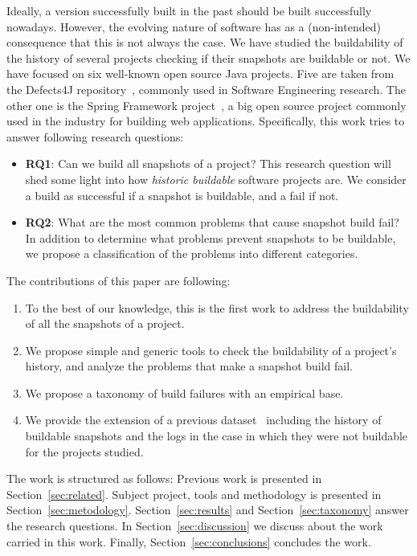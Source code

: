 Ideally, a version successfully built in the past should be built successfully nowadays.
However, the evolving nature of software has as a (non-intended) consequence that this is not always the case.
We have studied the buildability of the history of several projects checking if their snapshots are buildable or not.
We have focused on six well-known open source Java projects.
Five are taken from the Defects4J repository~\cite{Just:2014:DDE:2610384.2628055}, commonly used in Software Engineering research.
The other one is the Spring Framework project~\cite{Spring:2019:Online}, a big open source project commonly used in the industry for building web applications.
Specifically, this work tries to answer following research questions:

\begin{itemize}
	\item \textbf{RQ1}: Can we build all snapshots of a project? 
    This research question will shed some light into how \emph{historic buildable} software projects are. We consider a build as successful if a snapshot is buildable, and a fail if not.
	\item \textbf{RQ2}:  What are the most common problems that cause snapshot build fail?
    In addition to determine what problems prevent snapshots to be buildable, we propose a classification of the problems into different categories.
\end{itemize}

The contributions of this paper are following:
    
\begin{enumerate}
	\item To the best of our knowledge, this is the first work to address the buildability of all the snapshots of a project.
	\item We propose simple and generic tools to check the buildability of a project's history, and analyze the problems that make a snapshot build fail.
	\item We propose a taxonomy of build failures with an empirical base.
	\item We provide the extension of a previous dataset~\cite{Just:2014:DDE:2610384.2628055} including the history of buildable snapshots and the logs in the case in which they were not buildable for the projects studied.
\end{enumerate}

The work is structured as follows:
Previous work is presented in Section~\ref{sec:related}.
Subject project, tools and methodology is presented in Section~\ref{sec:metodology}.
Section~\ref{sec:results} and Section~\ref{sec:taxonomy} answer the research questions.
In Section~\ref{sec:discussion} we discuss about the work carried in this work.
Finally, Section~\ref{sec:conclusions} concludes the work.
